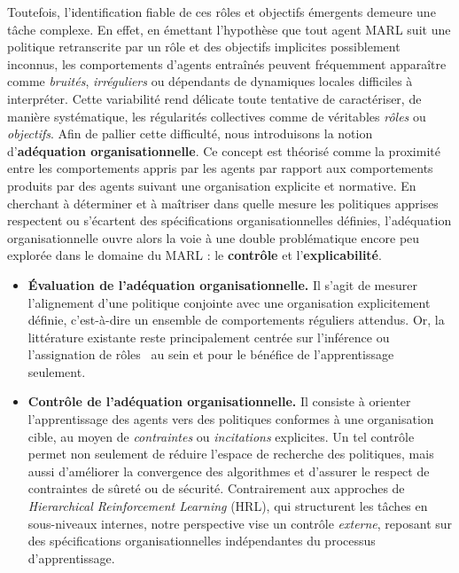 \documentclass[francais,ROIA,Unicode,manuscript]{cedram}
\begin{document}
\noindent
Toutefois, l’identification fiable de ces rôles et objectifs émergents demeure une tâche complexe. En effet, en émettant l'hypothèse que tout agent MARL suit une politique retranscrite par un rôle et des objectifs implicites possiblement inconnus, les comportements d'agents entraînés peuvent fréquemment apparaître comme \emph{bruités}, \emph{irréguliers} ou dépendants de dynamiques locales difficiles à interpréter. Cette variabilité rend délicate toute tentative de caractériser, de manière systématique, les régularités collectives comme de véritables \emph{rôles} ou \emph{objectifs}.
%
Afin de pallier cette difficulté, nous introduisons la notion d’\textbf{adéquation organisationnelle}. Ce concept est théorisé comme la proximité entre les comportements appris par les agents par rapport aux comportements produits par des agents suivant une organisation explicite et normative. En cherchant à déterminer et à maîtriser dans quelle mesure les politiques apprises respectent ou s’écartent des spécifications organisationnelles définies, l'adéquation organisationnelle ouvre alors la voie à une double problématique encore peu explorée dans le domaine du MARL : le \textbf{contrôle} et l’\textbf{explicabilité}.
%
\begin{itemize}
    \item \textbf{Évaluation de l’adéquation organisationnelle.}
          Il s’agit de mesurer l’alignement d’une politique conjointe avec une organisation explicitement définie, c’est-à-dire un ensemble de comportements réguliers attendus. Or, la littérature existante reste principalement centrée sur l’inférence ou l’assignation de rôles~\cite{Isakov2024, Wen2024, Xie2024} au sein et pour le bénéfice de l'apprentissage seulement.

    \item \textbf{Contrôle de l’adéquation organisationnelle.}
          Il consiste à orienter l’apprentissage des agents vers des politiques conformes à une organisation cible, au moyen de \emph{contraintes} ou \emph{incitations} explicites. Un tel contrôle permet non seulement de réduire l’espace de recherche des politiques, mais aussi d’améliorer la convergence des algorithmes et d’assurer le respect de contraintes de sûreté ou de sécurité. Contrairement aux approches de \textit{Hierarchical Reinforcement Learning} (HRL), qui structurent les tâches en sous-niveaux internes, notre perspective vise un contrôle \emph{externe}, reposant sur des spécifications organisationnelles indépendantes du processus d’apprentissage.
\end{itemize}
\end{document}
